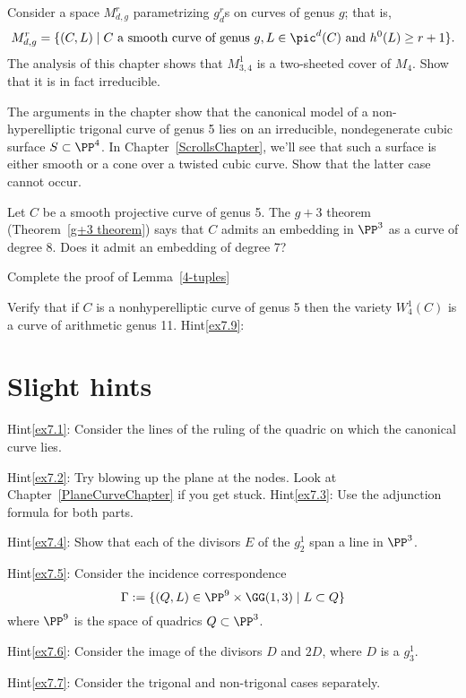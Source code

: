 \begin{exercise}\label{ex7.5}
Consider a space $M^r_{d,g}$ parametrizing $g^r_d$s on curves of genus $g$; that is,
$$
M^r_{d,g} = \{ (C, L) \mid C \text{ a smooth curve of genus } g, L \in \pic^d(C) \text{ and } h^0(L) \geq r+1 \}.
$$
The analysis of this chapter shows that $M^1_{3,4}$ is a two-sheeted cover of $M_4$. Show that it is in fact irreducible.
\end{exercise}

\begin{exercise}\label{ex7.6}
The arguments in the chapter show that the canonical model of a non-hyperelliptic trigonal curve of genus 5 lies on an irreducible, nondegenerate cubic surface $S \subset \PP^4$. In Chapter~\ref{ScrollsChapter}, we'll see that such a surface is either smooth or a cone over a twisted cubic curve. Show that the latter case cannot occur. 
\end{exercise}

\begin{exercise}\label{ex7.7}
Let $C$ be a smooth projective curve of genus 5. The $g+3$ theorem (Theorem~\ref{g+3 theorem}) says that $C$ admits an embedding in $\PP^3$ as a curve of degree 8. Does it admit an embedding of degree 7?
\end{exercise}

\begin{exercise}\label{non-red 4-tuples}\label{ex7.8}
Complete the proof of Lemma~\ref{4-tuples}
\end{exercise}

\begin{exercise}\label{ex7.9}
Verify that if $C$ is a nonhyperelliptic curve of genus 5 then the variety $W^1_4(C)$ is a curve of arithmetic genus 11.
Hint\ref{ex7.9}: \end{exercise}

\section{Slight hints}
Hint\ref{ex7.1}: Consider the lines of the ruling of the quadric on which the canonical curve lies.

Hint\ref{ex7.2}: Try blowing up the plane at the nodes. Look at Chapter~\ref{PlaneCurveChapter} if you get stuck.
Hint\ref{ex7.3}: Use the adjunction formula for both parts.

Hint\ref{ex7.4}: Show that each of the divisors $E$ of the $g^1_2$ span a line in $\PP^3$. 

Hint\ref{ex7.5}: Consider the incidence correspondence
$$
\Gamma := \{ (Q, L) \in \PP^9 \times \GG(1,3) \mid L \subset Q \}
$$
where $\PP^9$ is the space of quadrics $Q\subset \PP^3$.

Hint\ref{ex7.6}: Consider the image of the divisors $D$ and $2D$, where $D$ is a $g^1_3$.

Hint\ref{ex7.7}: Consider the trigonal and non-trigonal cases separately. 




